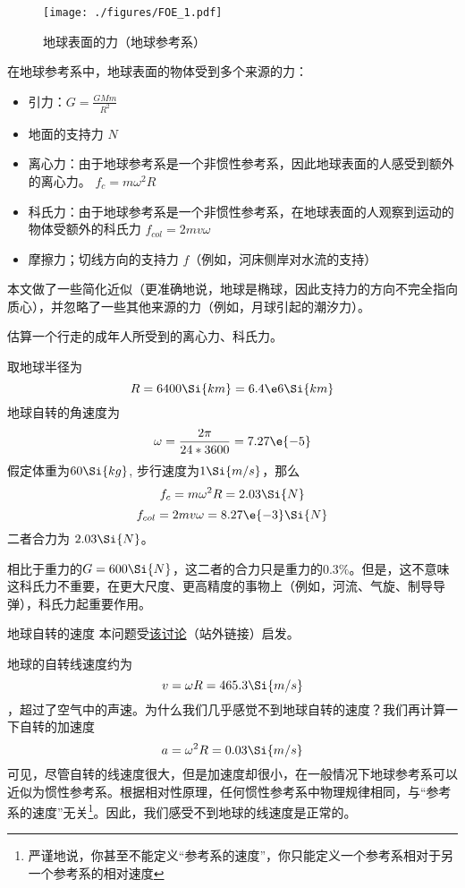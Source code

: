 
\begin{issues}
\issueDraft
{}
\end{issues}

\begin{figure}[ht]
\centering
\texttt{[image: ./figures/FOE\_1.pdf]}
\caption{地球表面的力（地球参考系）} \label{FOE_fig1}
\end{figure}

在地球参考系中，地球表面的物体受到多个来源的力：
\begin{itemize}
\item 引力：$G=\frac{GMm}{R^2}$
\item 地面的支持力 $N$
\item 离心力：由于地球参考系是一个非惯性参考系，因此地球表面的人感受到额外的离心力。 $f_c = m \omega^2 R$
\item 科氏力：由于地球参考系是一个非惯性参考系，在地球表面的人观察到运动的物体受额外的科氏力 $f_{col} = 2 m v \omega$
\item 摩擦力；切线方向的支持力 $f$（例如，河床侧岸对水流的支持）
\end{itemize}

本文做了一些简化近似（更准确地说，地球是椭球，因此支持力的方向不完全指向质心），并忽略了一些其他来源的力（例如，月球引起的潮汐力）。

\begin{example}{}
估算一个行走的成年人所受到的离心力、科氏力。

取地球半径为
$$R=6400\Si{km}=6.4\e6 \Si{km}$$
地球自转的角速度为
$$\omega = \frac{2\pi}{24*3600}=7.27\e{-5}$$
假定体重为$60 \Si{kg}$, 步行速度为$1 \Si{m/s}$，那么
$$
f_c = m \omega^2 R = 2.03 \Si{N}
$$
$$
f_{col} = 2 m v\omega = 8.27\e{-3} \Si{N}
$$
二者合力为 $2.03 \Si{N}$。

相比于重力的$G=600 \Si{N}$，这二者的合力只是重力的$0.3\%$。但是，这不意味这科氏力不重要，在更大尺度、更高精度的事物上（例如，河流、气旋、制导导弹），科氏力起重要作用。
\end{example}

\begin{example}{地球自转的速度}
本问题受\href{https://www.zhihu.com/question/579214803}{该讨论}（站外链接）启发。

地球的自转线速度约为 $$v=\omega R = 465.3 \Si{m/s}$$，超过了空气中的声速。为什么我们几乎感觉不到地球自转的速度？我们再计算一下自转的加速度
$$a=\omega^2 R= 0.03 \Si{m/s}$$
可见，尽管自转的线速度很大，但是加速度却很小，在一般情况下地球参考系可以近似为惯性参考系。根据相对性原理，任何惯性参考系中物理规律相同，与“参考系的速度”无关\footnote{严谨地说，你甚至不能定义“参考系的速度”，你只能定义一个参考系相对于另一个参考系的相对速度}。因此，我们感受不到地球的线速度是正常的。
\end{example}
